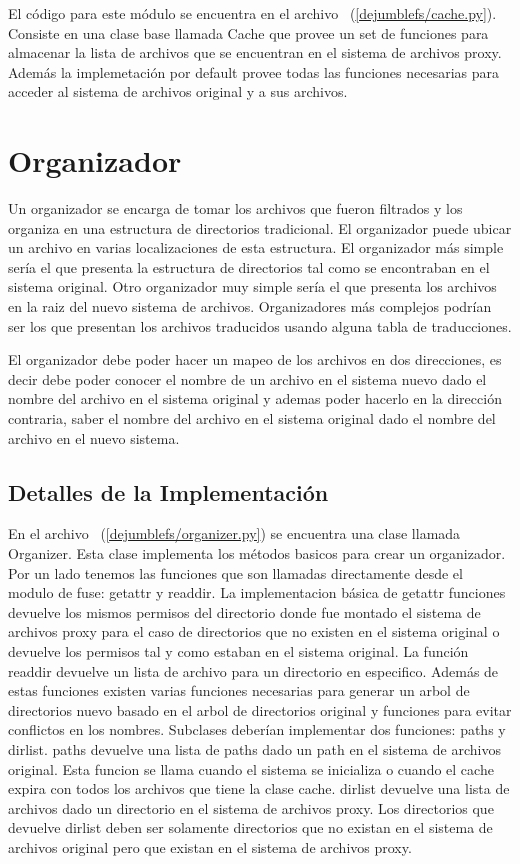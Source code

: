 El código para este módulo se encuentra en el archivo ~(\ref{dejumblefs/cache.py}). Consiste en una clase base llamada Cache que provee un set de funciones para almacenar la lista de archivos que se encuentran en el sistema de archivos proxy. Además la implemetación por default provee todas las funciones necesarias para acceder al sistema de archivos original y a sus archivos. 


\section{Organizador}

Un organizador se encarga de tomar los archivos que fueron filtrados y los organiza en una estructura de directorios tradicional. El organizador puede ubicar un archivo en varias localizaciones de esta estructura. El organizador más simple sería el que presenta la estructura de directorios tal como se encontraban en el sistema original. Otro organizador muy simple sería el que presenta los archivos en la raiz del nuevo sistema de archivos. Organizadores más complejos podrían ser los que presentan los archivos traducidos usando alguna tabla de traducciones.

El organizador debe poder hacer un mapeo de los archivos en dos direcciones, es decir debe poder conocer el nombre de un archivo en el sistema nuevo dado el nombre del archivo en el sistema original y ademas poder hacerlo en la dirección contraria, saber el nombre del archivo en el sistema original dado el nombre del archivo en el nuevo sistema.

\subsection{Detalles de la Implementación}

En el archivo ~(\ref{dejumblefs/organizer.py}) se encuentra una clase llamada Organizer. Esta clase implementa los métodos basicos para crear un organizador. Por un lado tenemos las funciones que son llamadas directamente desde el modulo de fuse: getattr y readdir. La implementacion básica de getattr funciones devuelve los mismos permisos del directorio donde fue montado el sistema de archivos proxy para el caso de directorios que no existen en el sistema original o devuelve los permisos tal y como estaban en el sistema original. La función readdir devuelve un lista de archivo para un directorio en especifico. Además de estas funciones existen varias funciones necesarias para generar un arbol de directorios nuevo basado en el arbol de directorios original y funciones para evitar conflictos en los nombres. Subclases deberían implementar dos funciones: paths y dirlist. paths devuelve una lista de paths dado un path en el sistema de archivos original. Esta funcion se llama cuando el sistema se inicializa o cuando el cache expira con todos los archivos que tiene la clase cache. dirlist devuelve una lista de archivos dado un directorio en el sistema de archivos proxy. Los directorios que devuelve dirlist deben ser solamente directorios que no existan en el sistema de archivos original pero que existan en el sistema de archivos proxy.


